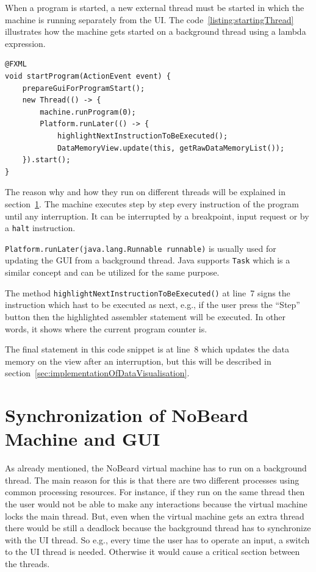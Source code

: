 When a program is started, a new external thread must be started in which the machine is running separately from the UI. The code~\ref{listing:startingThread} illustrates how the machine gets started on a background thread using a lambda expression.
\begin{lstlisting}[caption={Starting the machine on a new thread},label=listing:startingThread]
@FXML
void startProgram(ActionEvent event) {
    prepareGuiForProgramStart();
    new Thread(() -> {
        machine.runProgram(0);        
    	Platform.runLater(() -> {
            highlightNextInstructionToBeExecuted();
            DataMemoryView.update(this, getRawDataMemoryList());
    }).start();
}
\end{lstlisting}
The reason why and how they run on different threads will be explained in section~\ref{sec:synchronization}. The machine executes step by step every instruction of the program until any interruption. It can be interrupted by a breakpoint, input request or by a \lstinline$halt$ instruction. 

\lstinline$Platform.runLater(java.lang.Runnable runnable)$ is usually used for updating the GUI from a background thread. Java supports \lstinline$Task$ which is a similar concept and can be utilized for the same purpose. 

The method \lstinline$highlightNextInstructionToBeExecuted()$ at line~7 signs the instruction which hast to be executed as next, e.g., if the user press the ``Step'' button then the highlighted assembler statement will be executed. In other words, it shows where the current program counter is.

The final statement in this code snippet is at line~8 which updates the data memory on the view after an interruption, but this will be described in section~\ref{sec:implementationOfDataVisualisation}.

\section{Synchronization of NoBeard Machine and GUI}
\label{sec:synchronization} 
As already mentioned, the NoBeard virtual machine has to run on a background thread. The main reason for this is that there are two different processes using common processing resources. For instance, if they run on the same thread then the user would not be able to make any interactions because the virtual machine locks the main thread. But, even when the virtual machine gets an extra thread there would be still a deadlock because the background thread has to synchronize with the UI thread. So e.g., every time the user has to operate an input, a switch to the UI thread is needed. Otherwise it would cause a critical section between the threads. 

